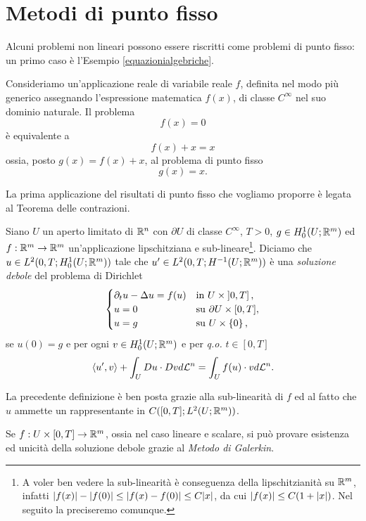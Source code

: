 \section{Metodi di punto fisso}
Alcuni problemi non lineari possono essere riscritti come problemi di punto fisso: un primo caso è l'Esempio \eqref{equazionialgebriche}.
\begin{esempio}
	Consideriamo un'applicazione reale di variabile reale $f$, definita nel modo più generico assegnando l'espressione matematica $f(x)$, di classe $C^\infty$ nel suo dominio naturale. Il problema 
	\[ f(x) = 0 \]
	è equivalente a 
	\[ f(x) + x = x \]
	ossia, posto $g(x) = f(x) + x$, al problema di punto fisso
	\[ g(x) = x. \]
\end{esempio}
La prima applicazione del risultati di punto fisso che vogliamo proporre è legata al Teorema delle contrazioni. 
\begin{definizione}
Siano $U$ un aperto limitato di $\mathbb{R}^n$ con $\partial U$ di classe $C^\infty$, $T>0$, $g \in H^1_0(U;\mathbb{R}^m)$ ed $f: \mathbb{R}^m \to \mathbb{R}^m$ un'applicazione lipschitziana e sub-lineare\footnote{A voler ben vedere la sub-linearità è conseguenza della lipschitzianità su $\mathbb{R}^m$, infatti $\lvert f(x)\rvert- \lvert f(0)\rvert\le \lvert f(x)-f(0)\rvert \le C\lvert x\rvert$, da cui $\lvert f(x)\rvert\le C(1+\lvert x\rvert)$. Nel seguito la preciseremo comunque.}. Diciamo che $u \in L^2(0,T;H^1_0(U;\mathbb{R}^m))$ tale che $u' \in L^2(0,T;H^{-1}(U;\mathbb{R}^m))$ è una \emph{soluzione debole} del problema di Dirichlet
	\[ 	\begin{cases}
		\partial_t u-\Delta u = f(u) & \textup{in } U \times \left] 0,T\right],\\
		u = 0 & \textup{su } \partial U \times [0,T],\\
		u=g & \textup{su }  U \times \left\lbrace 0\right\rbrace ,
	\end{cases} \]
	se $u(0) = g$ e per ogni $v \in H^1_0(U;\mathbb{R}^m)$ e per \emph{q.o.} $t \in [0,T]$
	\[ \braket{u',v} + \int_U Du \cdot Dv d\mathcal{L}^n = \int_U f(u)\cdot v d\mathcal{L}^n. \]
\end{definizione}
\begin{osservazione}
La precedente definizione è ben posta grazie alla sub-linearità di $f$ ed al fatto che $u$ ammette un rappresentante in $C([0,T];L^2(U;\mathbb{R}^m))$.
\end{osservazione}
\begin{osservazione}
Se $f: U \times [0,T] \to \mathbb{R}^m$, ossia nel caso lineare e scalare, si può provare esistenza ed unicità della soluzione debole grazie al \emph{Metodo di Galerkin}.
\end{osservazione}

